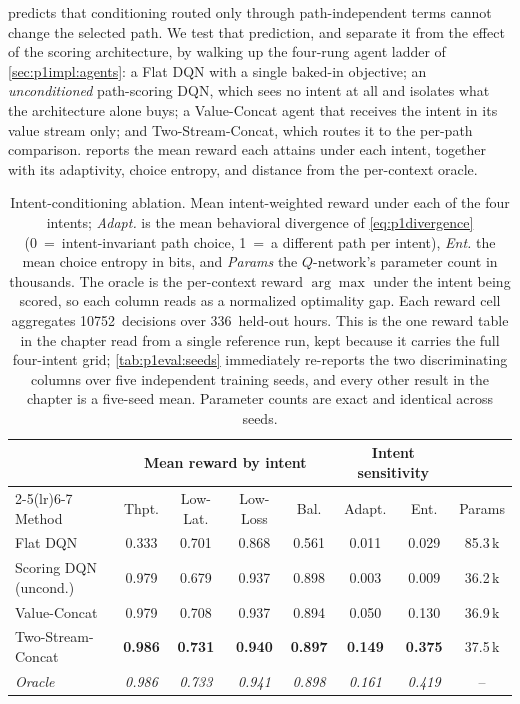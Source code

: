  predicts that conditioning routed only through path-independent terms cannot change
the selected path. We test that prediction, and separate it from the effect of the scoring architecture,
by walking up the four-rung agent ladder of \cref{sec:p1impl:agents}: a Flat DQN with a single baked-in
objective; an \emph{unconditioned} path-scoring DQN, which sees no intent at all and isolates what the
architecture alone buys; a Value-Concat agent that receives the intent in its value stream only; and
Two-Stream-Concat, which routes it to the per-path comparison.  reports the
mean reward each attains under each intent, together with its adaptivity, choice entropy, and distance
from the per-context oracle.

\begin{table}[t]
  \centering
  \caption[Intent-conditioning ablation]{Intent-conditioning ablation. Mean intent-weighted reward under each of the four intents;
  \emph{Adapt.} is the mean behavioral divergence of \cref{eq:p1divergence} (0~=~intent-invariant path
  choice, 1~=~a different path per intent), \emph{Ent.} the mean choice entropy in bits, and
  \emph{Params} the $Q$-network's parameter count in thousands. The oracle is the per-context reward
  $\arg\max$ under the intent being scored, so each column reads as a normalized optimality gap. Each
  reward cell aggregates 10752~decisions over 336~held-out hours. This is the one reward table in the
  chapter read from a single reference run, kept because it carries the full four-intent grid;
  \cref{tab:p1eval:seeds} immediately re-reports the two discriminating columns over five independent
  training seeds, and every other result in the chapter is a five-seed mean. Parameter counts are exact
  and identical across seeds.}
  \label{tab:p1eval:ablation}
  \small
  \begin{tabular}{lccccccc}
    \toprule
    & \multicolumn{4}{c}{Mean reward by intent} & \multicolumn{2}{c}{Intent sensitivity} & \\
    \cmidrule(lr){2-5}\cmidrule(lr){6-7}
    Method & Thpt. & Low-Lat. & Low-Loss & Bal. & Adapt. & Ent. & Params \\
    \midrule
    Flat DQN                & 0.333 & 0.701 & 0.868 & 0.561 & 0.011 & 0.029 & 85.3\,k \\
    Scoring DQN (uncond.)   & 0.979 & 0.679 & 0.937 & 0.898 & 0.003 & 0.009 & 36.2\,k \\
    Value-Concat            & 0.979 & 0.708 & 0.937 & 0.894 & 0.050 & 0.130 & 36.9\,k \\
    Two-Stream-Concat       & \textbf{0.986} & \textbf{0.731} & \textbf{0.940} & \textbf{0.897}
                            & \textbf{0.149} & \textbf{0.375} & 37.5\,k \\
    \midrule
    \emph{Oracle}           & \emph{0.986} & \emph{0.733} & \emph{0.941} & \emph{0.898}
                            & \emph{0.161} & \emph{0.419} & -- \\
    \bottomrule
  \end{tabular}
\end{table}

